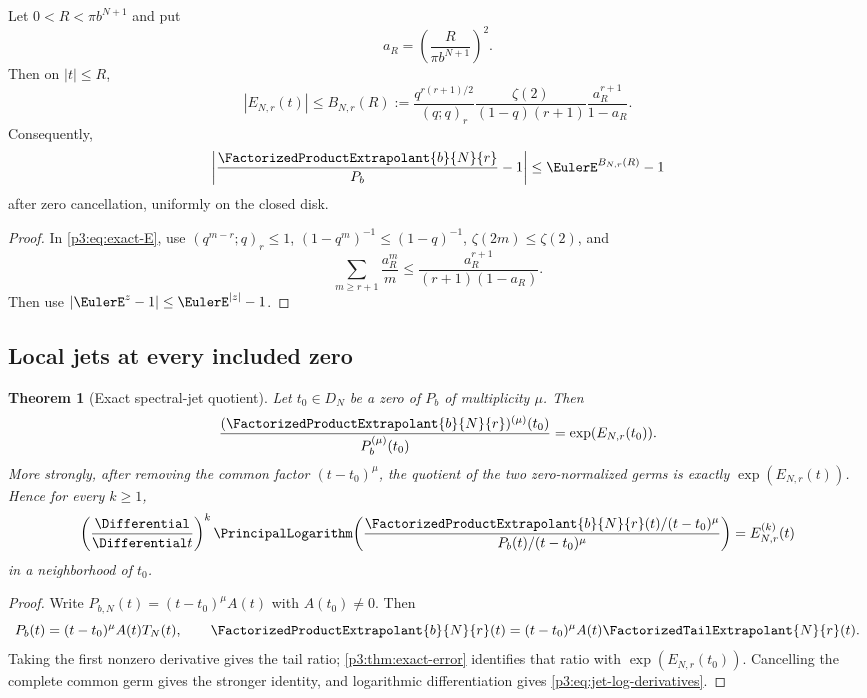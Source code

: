\documentclass[11pt]{article}
\numberwithin{equation}{section}
\newtheorem{theorem}{Theorem}[section]
\theoremstyle{definition}
\theoremstyle{remark}
\begin{document}
\begin{proposition}\label{p3:prop:disk-bound}
Let $0<R<\pi b^{N+1}$ and put
\[
 a_R=\left(\frac{R}{\pi b^{N+1}}\right)^2.
\]
Then on $|t|\le R$,
\begin{equation}
 |E_{N,r}(t)|\le B_{N,r}(R)
 :=\frac{q^{r(r+1)/2}}{(q;q)_r}
   \frac{\zeta(2)}{(1-q)(r+1)}
   \frac{a_R^{r+1}}{1-a_R}.
 \label{p3:eq:Bbound}
\end{equation}
Consequently,
\begin{equation}
 \left|\frac{\FactorizedProductExtrapolant{b}{N}{r}}{P_b}-1\right|
 \le \EulerE^{B_{N,r}(R)}-1
 \label{p3:eq:relative-bound}
\end{equation}
after zero cancellation, uniformly on the closed disk.
\end{proposition}

\begin{proof}
In \eqref{p3:eq:exact-E}, use
$(q^{m-r};q)_r\le1$, $(1-q^m)^{-1}\le(1-q)^{-1}$,
$\zeta(2m)\le\zeta(2)$, and
\[
 \sum_{m\ge r+1}\frac{a_R^m}{m}
 \le\frac{a_R^{r+1}}{(r+1)(1-a_R)}.
\]
Then use $|\EulerE^z-1|\le\EulerE^{|z|}-1$.
\end{proof}

\subsection{Local jets at every included zero}

\begin{theorem}[Exact spectral-jet quotient]\label{p3:thm:jet-quotient}
Let $t_0\in D_N$ be a zero of $P_b$ of multiplicity $\mu$.  Then
\begin{equation}
 \frac{(\FactorizedProductExtrapolant{b}{N}{r})^{(\mu)}(t_0)}
      {P_b^{(\mu)}(t_0)}
 =\exp(E_{N,r}(t_0)).
 \label{p3:eq:first-derivative-ratio}
\end{equation}
More strongly, after removing the common factor $(t-t_0)^\mu$, the quotient of the two
zero-normalized germs is exactly $\exp(E_{N,r}(t))$.  Hence for every $k\ge1$,
\begin{equation}
 \left(\frac{\Differential}{\Differential t}\right)^k
 \PrincipalLogarithm\!\left(
 \frac{\FactorizedProductExtrapolant{b}{N}{r}(t)/(t-t_0)^\mu}
      {P_b(t)/(t-t_0)^\mu}
 \right)
 =E_{N,r}^{(k)}(t)
 \label{p3:eq:jet-log-derivatives}
\end{equation}
in a neighborhood of $t_0$.
\end{theorem}

\begin{proof}
Write $P_{b,N}(t)=(t-t_0)^\mu A(t)$ with $A(t_0)\ne0$.  Then
\[
 P_b(t)=(t-t_0)^\mu A(t)T_N(t),\qquad
 \FactorizedProductExtrapolant{b}{N}{r}(t)=(t-t_0)^\mu A(t)\FactorizedTailExtrapolant{N}{r}(t).
\]
Taking the first nonzero derivative gives the tail ratio; \cref{p3:thm:exact-error} identifies
that ratio with $\exp(E_{N,r}(t_0))$.  Cancelling the complete common germ gives the stronger
identity, and logarithmic differentiation gives \eqref{p3:eq:jet-log-derivatives}.
\end{proof}
\end{document}
